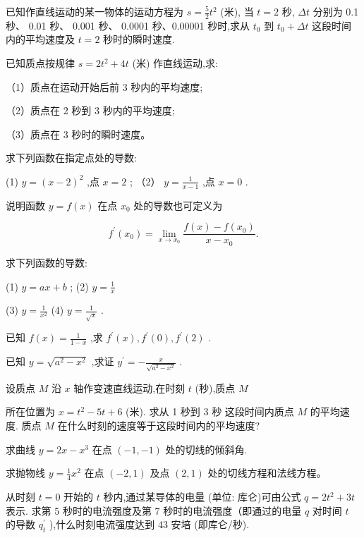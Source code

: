 \documentclass[lang=cn,newtx,12pt,scheme=chinese]{elegantbook}
\begin{document}
\begin{problemset}[习 题 四]

\item 已知作直线运动的某一物体的运动方程为 \(s = \frac{5}{2}{t}^{2}\) (米), 当 \(t = 2\) 秒, \({\Delta t}\) 分别为 0.1 秒、 0.01 秒、 0.001 秒、 0.0001 秒、0.00001 秒时,求从 \({t}_{0}\) 到 \({t}_{0} + {\Delta t}\) 这段时间内的平均速度及 \(t = 2\) 秒时的瞬时速度.

\item 已知质点按规律 \(s = 2{t}^{2} + {4t}\) (米) 作直线运动,求:

（1）质点在运动开始后前 3 秒内的平均速度;

（2）质点在 2 秒到 3 秒内的平均速度;

（3）质点在 3 秒时的瞬时速度。

\item 求下列函数在指定点处的导数:

(1) \(y = {\left( x - 2\right) }^{2}\) ,点 \(x = 2\) ; （2） \(y = \frac{1}{x - 1}\) ,点 \(x = 0\) .

\item 说明函数 \(y = f\left( x\right)\) 在点 \({x}_{0}\) 处的导数也可定义为

\[
{f}^{\prime }\left( {x}_{0}\right) = \mathop{\lim }\limits_{{x \rightarrow {x}_{0}}}\frac{f\left( x\right) - f\left( {x}_{0}\right) }{x - {x}_{0}}.
\]

\item 求下列函数的导数:

(1) \(y = {ax} + b\) ; (2) \(y = \frac{1}{x}\)

(3) \(y = \frac{1}{{x}^{2}}\) (4) \(y = \frac{1}{\sqrt{x}}\) .

\item 已知 \(f\left( x\right) = \frac{1}{1 - x}\) ,求 \({f}^{\prime }\left( x\right) ,{f}^{\prime }\left( 0\right) ,{f}^{\prime }\left( 2\right)\) .

\item 已知 \(y = \sqrt{{a}^{2} - {x}^{2}}\) ,求证 \({y}^{\prime } = - \frac{x}{\sqrt{{a}^{2} - {x}^{2}}}\) .

\item 设质点 \(M\) 沿 \(x\) 轴作变速直线运动,在时刻 \(t\) (秒),质点 \(M\)

所在位置为 \(x = {t}^{2} - {5t} + 6\) (米). 求从 1 秒到 3 秒 这段时间内质点 \(M\) 的平均速度. 质点 \(M\) 在什么时刻的速度等于这段时间内的平均速度?

\item 求曲线 \(y = {2x} - {x}^{3}\) 在点 \(\left( {-1, - 1}\right)\) 处的切线的倾斜角.

\item 求抛物线 \(y = \frac{1}{4}{x}^{2}\) 在点 \(\left( {-2,1}\right)\) 及点 \(\left( {2,1}\right)\) 处的切线方程和法线方程。

\item 从时刻 \(t = 0\) 开始的 \(t\) 秒内,通过某导体的电量 (单位: 库仑)可由公式 \(q = 2{t}^{2} + {3t}\) 表示. 求第 5 秒时的电流强度及第 7 秒时的电流强度（即通过的电量 \(q\) 对时间 \(t\) 的导数 \({q}_{t}^{\prime }\) ),什么时刻电流强度达到 43 安培 (即库仑/秒).

\end{problemset}
\end{document}
